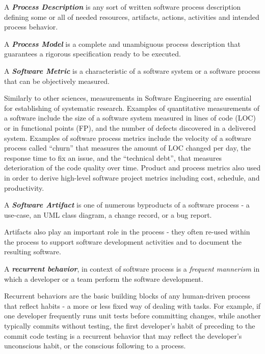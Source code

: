 \begin{defn}\label{def_process_desc}
A \textbf{\textit{Process Description}} is any sort of written software process description defining 
some or all of needed resources, artifacts, actions, activities and intended process behavior.
\end{defn}

\begin{defn}\label{def_process_model}
A \textbf{\textit{Process Model}} is a complete and unambiguous process description that guarantees 
a rigorous specification ready to be executed.
\end{defn}

\begin{defn}\label{def_metric}
A \textbf{\textit{Software Metric}} is a characteristic of a software system or a software process that can be 
objectively measured.
\end{defn}
Similarly to other sciences, measurements in Software Engineering are essential for establishing of systematic 
research. Examples of quantitative measurements of a software include the size of a software system measured 
in lines of code (LOC) or in functional points (FP), and the number of defects discovered in a delivered system. 
Examples of software process metrics include the velocity of a software process called ``churn'' that 
measures the amount of LOC changed per day, the response time to fix an issue, and the ``technical debt'', 
that measures deterioration of the code quality over time. 
Product and process metrics also used in order to derive high-level software project metrics including cost, 
schedule, and productivity.

\begin{defn}\label{def_artifact}
A \textbf{\textit{Software Artifact}} is one of numerous byproducts of a software process - a use-case, 
an UML class diagram, a change record, or a bug report. 
\end{defn}
Artifacts also play an important role in the process - they often re-used within the process to support 
software development activities and to document the resulting software.

\begin{defn}\label{def_behavior}
A \textbf{\textit{recurrent behavior}}, in context of software process is a \textit{frequent mannerism} 
in which a developer or a team perform the software development. 
\end{defn}
Recurrent behaviors are the basic building blocks of any human-driven process that reflect habits - 
a more or less fixed way of dealing with tasks.
For example, if one developer frequently runs unit tests before committing changes, while another typically 
commits without testing, the first developer's habit of preceding to the commit code testing 
is a recurrent behavior that may reflect the developer's unconscious habit, or the conscious following 
to a process.

